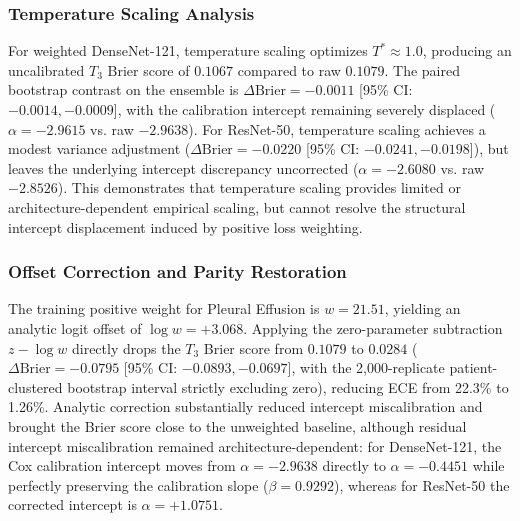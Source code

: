 \documentclass[preprint,12pt]{elsarticle}
\begin{document}
\begin{table}[!t]
\caption{Multi-Calibrator Comparison on Pleural Effusion: Deidentified-Date Ensemble Performance, Calibration Intercept ($\alpha$), Slope ($\beta$), and Paired Bootstrap Contrasts. Complete 12-column factorial evaluation across all intermediate strata and log-loss is provided in Supplementary Table~S4.}
\label{tab:calibrator_comparison}
\centering
\small
\resizebox{\textwidth}{!}{%

}
\end{table}

\subsubsection{Temperature Scaling Analysis}
For weighted DenseNet-121, temperature scaling optimizes $T^* \approx 1.0$, producing an uncalibrated $T_3$ Brier score of $0.1067$ compared to raw $0.1079$. The paired bootstrap contrast on the ensemble is $\Delta\text{Brier} = -0.0011$ [95\% CI: $-0.0014, -0.0009$], with the calibration intercept remaining severely displaced ($\alpha = -2.9615$ vs. raw $-2.9638$). For ResNet-50, temperature scaling achieves a modest variance adjustment ($\Delta\text{Brier} = -0.0220$ [95\% CI: $-0.0241, -0.0198$]), but leaves the underlying intercept discrepancy uncorrected ($\alpha = -2.6080$ vs. raw $-2.8526$). This demonstrates that temperature scaling provides limited or architecture-dependent empirical scaling, but cannot resolve the structural intercept displacement induced by positive loss weighting.

\subsubsection{Offset Correction and Parity Restoration}
The training positive weight for Pleural Effusion is $w = 21.51$, yielding an analytic logit offset of $\log w = +3.068$. Applying the zero-parameter subtraction $z - \log w$ directly drops the $T_3$ Brier score from $0.1079$ to $0.0284$ ($\Delta\text{Brier} = -0.0795$ [95\% CI: $-0.0893, -0.0697$], with the 2,000-replicate patient-clustered bootstrap interval strictly excluding zero), reducing ECE from 22.3\% to 1.26\%. Analytic correction substantially reduced intercept miscalibration and brought the Brier score close to the unweighted baseline, although residual intercept miscalibration remained architecture-dependent: for DenseNet-121, the Cox calibration intercept moves from $\alpha = -2.9638$ directly to $\alpha = -0.4451$ while perfectly preserving the calibration slope ($\beta = 0.9292$), whereas for ResNet-50 the corrected intercept is $\alpha = +1.0751$.
\end{document}
